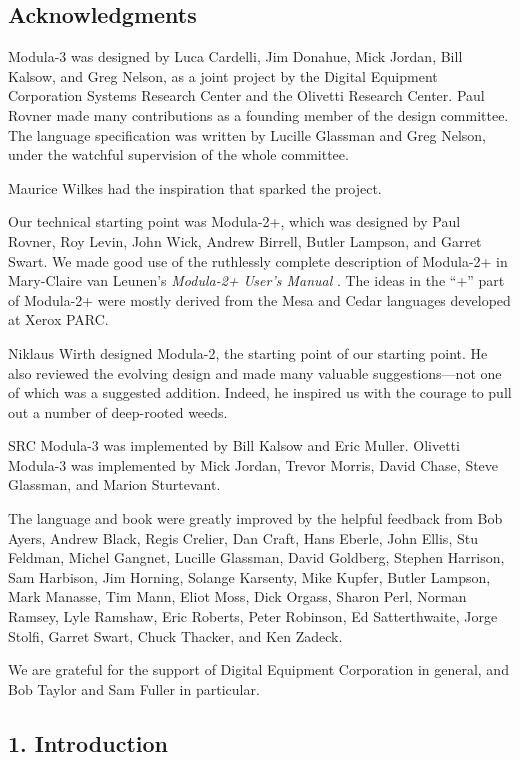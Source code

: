 \documentclass[10pt]{article}
\begin{document}
\subsection*{Acknowledgments}


  Modula-3 was designed by Luca Cardelli, Jim Donahue, Mick Jordan, Bill Kalsow, and Greg Nelson, as a joint project by the Digital Equipment Corporation Systems Research Center and the Olivetti Research Center. Paul Rovner made many contributions as a founding member of the design committee. The language specification was written by Lucille Glassman and Greg Nelson, under the watchful supervision of the whole committee. 


  Maurice Wilkes had the inspiration that sparked the project. 


  Our technical starting point was Modula-2+, which was designed by Paul Rovner, Roy Levin, John Wick, Andrew Birrell, Butler Lampson, and Garret Swart. We made good use of the ruthlessly complete description of Modula-2+ in Mary-Claire van Leunen's \emph{Modula-2+ User's Manual}
. The ideas in the ``+'' part of Modula-2+ were mostly derived from the Mesa and Cedar languages developed at Xerox PARC. 


  Niklaus Wirth designed Modula-2, the starting point of our starting point. He also reviewed the evolving design and made many valuable suggestions---not one of which was a suggested addition. Indeed, he inspired us with the courage to pull out a number of deep-rooted weeds. 


  SRC Modula-3 was implemented by Bill Kalsow and Eric Muller. Olivetti Modula-3 was implemented by Mick Jordan, Trevor Morris, David Chase, Steve Glassman, and Marion Sturtevant. 


  The language and book were greatly improved by the helpful feedback from Bob Ayers, Andrew Black, Regis Crelier, Dan Craft, Hans Eberle, John Ellis, Stu Feldman, Michel Gangnet, Lucille Glassman, David Goldberg, Stephen Harrison, Sam Harbison, Jim Horning, Solange Karsenty, Mike Kupfer, Butler Lampson, Mark Manasse, Tim Mann, Eliot Moss, Dick Orgass, Sharon Perl, Norman Ramsey, Lyle Ramshaw, Eric Roberts, Peter Robinson, Ed Satterthwaite, Jorge Stolfi, Garret Swart, Chuck Thacker, and Ken Zadeck. 


  We are grateful for the support of Digital Equipment Corporation in general, and Bob Taylor and Sam Fuller in particular. 


 
\subsection*{1. Introduction}
\end{document}
